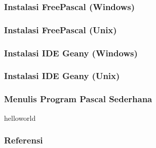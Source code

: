 \documentclass{beamer}
\begin{document}
\begin{frame}
\frametitle{Instalasi FreePascal (Windows)}
\end{frame}

\begin{frame}
\frametitle{Instalasi FreePascal (Unix)}
\end{frame}

\begin{frame}
\frametitle{Instalasi IDE Geany (Windows)}
\end{frame}

\begin{frame}
\frametitle{Instalasi IDE Geany (Unix)}
\end{frame}

\begin{frame}
\frametitle{Menulis Program Pascal Sederhana}
helloworld
\end{frame}

\begin{frame}
\frametitle{Referensi}
\end{frame}
\end{document}
